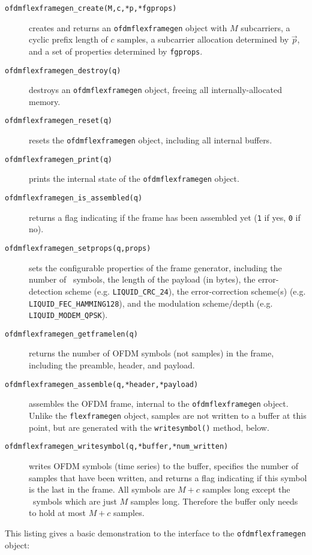 \begin{description}
%
\item[{\tt ofdmflexframegen\_create(M,c,*p,*fgprops)}]
    creates and returns an {\tt ofdmflexframegen} object
    with $M$ subcarriers,
    a cyclic prefix length of $c$ samples,
    a subcarrier allocation determined by $\vec{p}$,
    and a set of properties determined by {\tt fgprops}.
%
\item[{\tt ofdmflexframegen\_destroy(q)}]
    destroys an {\tt ofdmflexframegen} object, freeing all
    internally-allocated memory.
%
\item[{\tt ofdmflexframegen\_reset(q)}]
    resets the {\tt ofdmflexframegen} object, including all internal
    buffers.
%
\item[{\tt ofdmflexframegen\_print(q)}]
    prints the internal state of the {\tt ofdmflexframegen} object.
%
\item[{\tt ofdmflexframegen\_is\_assembled(q)}]
    returns a flag indicating if the frame has been assembled yet
    ({\tt 1} if yes, {\tt 0} if no).
%
\item[{\tt ofdmflexframegen\_setprops(q,props)}]
    sets the configurable properties of the frame generator, including
    the number of \Ss\ symbols,
    the length of the payload (in bytes),
    the error-detection scheme (e.g. {\tt LIQUID\_CRC\_24}),
    the error-correction scheme(s) (e.g. {\tt LIQUID\_FEC\_HAMMING128}),
    and the modulation scheme/depth (e.g. {\tt LIQUID\_MODEM\_QPSK}).
%
\item[{\tt ofdmflexframegen\_getframelen(q)}]
    returns the number of OFDM symbols (not samples) in the frame,
    including the preamble, header, and payload.
%
\item[{\tt ofdmflexframegen\_assemble(q,*header,*payload)}]
    assembles the OFDM frame, internal to the {\tt ofdmflexframegen}
    object.
    Unlike the {\tt flexframegen} object, samples are not written to a
    buffer at this point, but are generated with the
    {\tt writesymbol()} method, below.
%
\item[{\tt ofdmflexframegen\_writesymbol(q,*buffer,*num\_written)}]
    writes OFDM symbols (time series) to the buffer, specifies the
    number of samples that have been written, and returns a flag
    indicating if this symbol is the last in the frame.
    All symbols are $M+c$ samples long except the \Ss\ symbols which are
    just $M$ samples long.
    Therefore the buffer only needs to hold at most $M+c$ samples.
%
\end{description}
%
This listing gives a basic demonstration to the interface to the
{\tt ofdmflexframegen} object:
%

%


